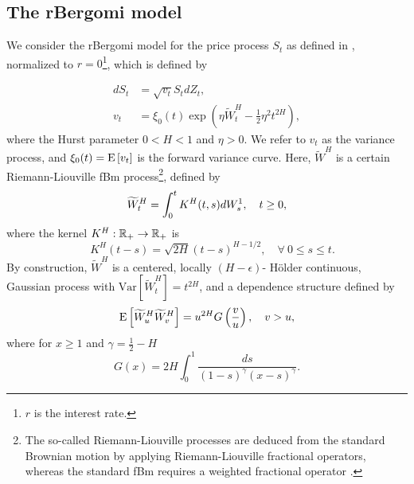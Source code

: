 

\subsection{The rBergomi model}\label{sec:The rBergomi model}

We consider the rBergomi model for the price process $S_t$ as defined in  \cite{bayer2016pricing}, normalized to $r=0$\footnote{$r$ is the interest rate.}, which is defined by

\begin{align}\label{eq:rBergomi_model1}
	dS_t &= \sqrt{v_t} S_t dZ_t, \nonumber \\
	v_t &= \xi_0(t) \exp\left( \eta \widetilde{W}_t^H - \frac{1}{2} \eta^2 t^{2H} \right),
\end{align}
where the Hurst parameter $0 < H < 1$  and  $\eta>0$. We refer to $v_t$ as the variance process, and $\xi_0(t) = \mathrm{E}\left[v_t\right]$ is  the forward variance curve.  Here, $\widetilde{W}^H $ is a certain Riemann-Liouville fBm
process\footnote{The so-called Riemann-Liouville processes are deduced from the standard Brownian motion by applying Riemann-Liouville fractional operators, whereas the standard fBm requires a weighted fractional operator \cite{marinucci1999alternative,picard2011representation}.},  defined by
\begin{align}\label{eq:Volterra process}
	\widetilde{W}_t^H = \int_0^t K^H(t,s) dW_s^1, \quad t \ge 0 ,
\end{align}
where the kernel $K^H : \mathbb{R}_+  \rightarrow \mathbb{R}_+$ is
\begin{equation}\label{eq:kernel_rbergomi}
 \quad K^H(t-s) = \sqrt{2H} (t-s)^{H - 1/2},\quad \forall \: 0 \le s \le t.
\end{equation}
By construction, $\widetilde{W}^H $ is a centered, locally $(H-\epsilon)$- H\"older continuous, Gaussian process with $\text{Var}\left[\widetilde{W}^H_t \right] = t^{2H}$, and a dependence structure defined by 
 \begin{equation*}
 \mathrm{E}\left[\widetilde{W}^H_u  \widetilde{W}^H_v\right]=u^{2H} G\left(\frac{v}{u} \right),\quad v >u ,
 \end{equation*}
 where for $x \ge 1$ and $\gamma=\frac{1}{2}-H$
 \begin{equation}\label{eq:correlation_tilde_W_fun}
G(x)=2H \int_{0}^1 \frac{ds}{(1-s)^{\gamma} (x-s)^{\gamma}}.
 \end{equation}
